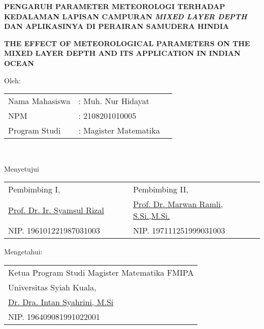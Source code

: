 \setcounter{page}{2}
\vspace{1.5pc}
\begin{center}
	\textbf{PENGARUH PARAMETER METEOROLOGI TERHADAP KEDALAMAN LAPISAN CAMPURAN \textit{MIXED LAYER DEPTH} DAN APLIKASINYA DI PERAIRAN SAMUDERA HINDIA}
\end{center}
\vspace{1pc}
\begin{center}
	\textbf{THE EFFECT OF METEOROLOGICAL PARAMETERS ON THE MIXED LAYER DEPTH AND ITS APPLICATION IN INDIAN OCEAN}
\end{center}
\vspace{1pc}

\begin{center}
	Oleh:
\end{center}
\vspace{1pc}
\begin{center}
	
	\normalsize
	\noindent
	\begin{tabular}{l l l}
		Nama Mahasiswa &: Muh. Nur Hidayat \\
		NPM &: 2108201010005 \\
		Program Studi	&: Magister Matematika \\ 
	\end{tabular} \\
\end{center}

\begin{center}
	\vspace{2cm}
	Menyetujui\\
	
	\vspace{1cm}
	
	\begin{tabular}{l l }
		Pembimbing I,\verb"                 " & Pembimbing II, \verb"            "\\[2.25cm]
		\underline{Prof. Dr. Ir. Syamsul Rizal} & \underline{Prof. Dr. Marwan Ramli, S.Si.,M.Si.}\\
		NIP. 196101221987031003 & NIP. 197111251999031003
	\end{tabular}
\end{center}

\begin{center}
	\vspace{0.5cm}
	Mengetahui:\\%
	
	\vspace{1cm}
	
	\begin{tabular}{l }
		Ketua Program Studi Magister Matematika FMIPA\\
		Universitas Syiah Kuala,\\[2.25cm]
		\underline{Dr. Dra. Intan Syahrini, M.Si}\\
		NIP. 196409081991022001
	\end{tabular}
\end{center}
\vspace{0.3cm}
\begin{center}
	
\end{center}
\thispagestyle{empty}
